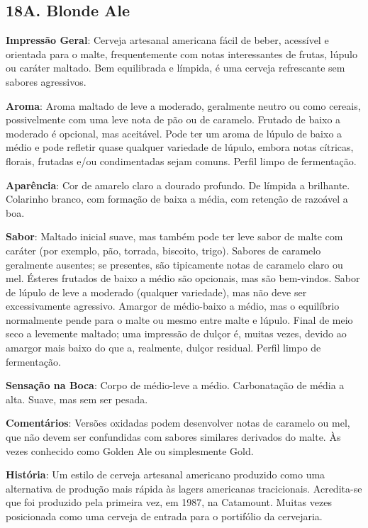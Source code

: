 \subsection*{18A. Blonde Ale}
\textbf{Impressão Geral}: Cerveja artesanal americana fácil de beber, acessível e orientada para o malte, frequentemente com notas interessantes de frutas, lúpulo ou caráter maltado. Bem equilibrada e límpida, é uma cerveja refrescante sem sabores agressivos.

\textbf{Aroma}: Aroma maltado de leve a moderado, geralmente neutro ou como cereais, possivelmente com uma leve nota de pão ou de caramelo. Frutado de baixo a moderado é opcional, mas aceitável. Pode ter um aroma de lúpulo de baixo a médio e pode refletir quase qualquer variedade de lúpulo, embora notas cítricas, florais, frutadas e/ou condimentadas sejam comuns. Perfil limpo de fermentação.

\textbf{Aparência}: Cor de amarelo claro a dourado profundo. De límpida a brilhante. Colarinho branco, com formação de baixa a média, com retenção de razoável a boa.

\textbf{Sabor}: Maltado inicial suave, mas também pode ter leve sabor de malte com caráter (por exemplo, pão, torrada, biscoito, trigo). Sabores de caramelo geralmente ausentes; se presentes, são tipicamente notas de caramelo claro ou mel. Ésteres frutados de baixo a médio são opcionais, mas são bem-vindos. Sabor de lúpulo de leve a moderado (qualquer variedade), mas não deve ser excessivamente agressivo. Amargor de médio-baixo a médio, mas o equilíbrio normalmente pende para o malte ou mesmo entre malte e lúpulo. Final de meio seco a levemente maltado; uma impressão de dulçor é, muitas vezes, devido ao amargor mais baixo do que a, realmente, dulçor residual. Perfil limpo de fermentação.

\textbf{Sensação na Boca}: Corpo de médio-leve a médio. Carbonatação de média a alta. Suave, mas sem ser pesada.

\textbf{Comentários}: Versões oxidadas podem desenvolver notas de caramelo ou mel, que não devem ser confundidas com sabores similares derivados do malte. Às vezes conhecido como Golden Ale ou simplesmente Gold.

\textbf{História}: Um estilo de cerveja artesanal americano produzido como uma alternativa de produção mais rápida às lagers americanas tracicionais. Acredita-se que foi produzido pela primeira vez, em 1987, na Catamount. Muitas vezes posicionada como uma cerveja de entrada para o portifólio da cervejaria.

